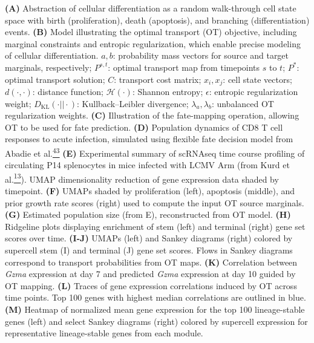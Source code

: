 \textbf{(A)} Abstraction of cellular differentiation as a random
walk-through cell state space with birth (proliferation), death
(apoptosis), and branching (differentiation) events. \textbf{(B)} Model
illustrating the optimal transport (OT) objective, including marginal
constraints and entropic regularization, which enable precise modeling
of cellular differentiation. \(a,b\): probability mass vectors for
source and target marginals, respectively; \(P^{s,t}\): optimal
transport map from timepoints \(s\) to \(t\); \(P^{*}:\) optimal
transport solution; \(C\): transport cost matrix; \(x_{i},x_{j}\): cell
state vectors; \(d\left( \cdot , \cdot \right)\): distance function;
\(\mathcal{H}\left( \cdot \right)\): Shannon entropy; \(\epsilon\):
entropic regularization weight; \(D_{\text{KL}}( \cdot || \cdot )\):
Kullback--Leibler divergence; \(\lambda_{a},\lambda_{b}\): unbalanced OT
regularization weights. \textbf{(C)} Illustration of the fate-mapping
operation, allowing OT to be used for fate prediction. \textbf{(D)}
Population dynamics of CD8 T cell responses to acute infection,
simulated using flexible fate decision model from Abadie et
al.\href{https://sciwheel.com/work/citation?ids=15970531\&pre=\&suf=\&sa=0\&dbf=0}{\textsuperscript{43}}
\textbf{(E)} Experimental summary of scRNAseq time course profiling of
circulating P14 splenocytes in mice infected with LCMV Arm (from Kurd et
al.\href{https://sciwheel.com/work/citation?ids=8917053\&pre=\&suf=\&sa=0\&dbf=0}{\textsuperscript{13}}).
UMAP dimensionality reduction of gene expression data shaded by
timepoint. \textbf{(F)} UMAPs shaded by proliferation (left), apoptosis
(middle), and prior growth rate scores (right) used to compute the input
OT source marginals. \textbf{(G)} Estimated population size (from E),
reconstructed from OT model. \textbf{(H)} Ridgeline plots displaying
enrichment of stem (left) and terminal (right) gene set scores over
time. \textbf{(I-J)} UMAPs (left) and Sankey diagrams (right) colored by
supercell stem (I) and terminal (J) gene set scores. Flows in Sankey
diagrams correspond to transport probabilities from OT maps.
\textbf{(K)} Correlation between \emph{Gzma} expression at day 7 and
predicted \emph{Gzma} expression at day 10 guided by OT mapping.
\textbf{(L)} Traces of gene expression correlations induced by OT across
time points. Top 100 genes with highest median correlations are outlined
in blue. \textbf{(M)} Heatmap of normalized mean gene expression for the
top 100 lineage-stable genes (left) and select Sankey diagrams (right)
colored by supercell expression for representative lineage-stable genes
from each module.

